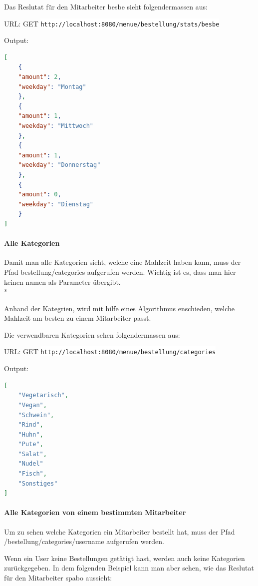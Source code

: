Das Reslutat für den Mitarbeiter besbe sieht folgendermassen aus:


URL: GET \colorbox{white}{\lstinline[basicstyle=\ttfamily\color{black},language=html]|http://localhost:8080/menue/bestellung/stats/besbe|}


Output:

\begin{lstlisting}[language=json,firstnumber=1]
[
    {
    "amount": 2,
    "weekday": "Montag"
    },
    {
    "amount": 1,
    "weekday": "Mittwoch"
    },
    {
    "amount": 1,
    "weekday": "Donnerstag"
    },
    {
    "amount": 0,
    "weekday": "Dienstag"
    }
]
\end{lstlisting}

\paragraph{Alle Kategorien}

Damit man alle Kategorien sieht, welche eine Mahlzeit haben kann, muss der Pfad bestellung/categories aufgerufen werden.
Wichtig ist es, dass man hier keinen namen als Parameter übergibt. \\*

Anhand der Kategrien, wird mit hilfe eines Algorithmus enschieden, welche Mahlzeit am besten zu einem Mitarbeiter passt. 

Die verwendbaren Kategorien sehen folgendermassen aus:

URL: GET \colorbox{white}{\lstinline[basicstyle=\ttfamily\color{black},language=html]|http://localhost:8080/menue/bestellung/categories|}

Output:

\begin{lstlisting}[language=json,firstnumber=1]
[
    "Vegetarisch",
    "Vegan",
    "Schwein",
    "Rind",
    "Huhn",
    "Pute",
    "Salat",
    "Nudel"
    "Fisch",
    "Sonstiges"
]
\end{lstlisting}

\paragraph{Alle Kategorien von einem bestimmten Mitarbeiter}

Um zu sehen welche Kategorien ein Mitarbeiter bestellt hat, muss der Pfad /bestellung/categories/{username} aufgerufen werden.

Wenn ein User keine Bestellungen getätigt hast, werden auch keine Kategorien zurückgegeben. In dem folgenden Beispiel kann man aber sehen, wie das Reslutat
für den Mitarbeiter spabo aussieht:

